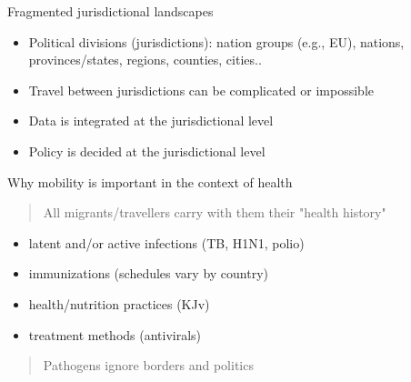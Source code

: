 \documentclass[aspectratio=43]{beamer}
\begin{document}







{
\begin{frame}{Fragmented jurisdictional landscapes}
	\begin{itemize}
		\item  Political divisions (jurisdictions): nation groups (e.g., EU), nations, provinces/states, regions, counties, cities..
		\vfill
		\item Travel between jurisdictions can be complicated or impossible
		\vfill
		\item Data is integrated at the jurisdictional level
		\vfill
		\item Policy is decided at the jurisdictional level
	\end{itemize}
\end{frame}
}

\begin{frame}{Why mobility is important in the context of health}
	\begin{quote}
		All migrants/travellers carry with them their "health history"
	\end{quote}
	\vfill
	\begin{itemize}
		\item latent and/or active infections (TB, H1N1, polio)
		\item immunizations (schedules vary by country)
		\item health/nutrition practices (KJv)
		\item treatment methods (antivirals)
	\end{itemize}
	\vfill
	\begin{quote}
		Pathogens ignore borders and politics
	\end{quote}
\end{frame}

\end{document}
